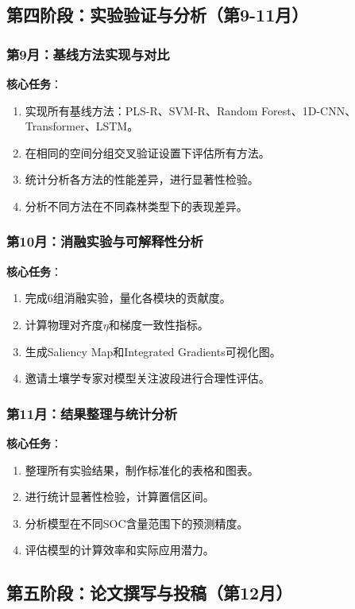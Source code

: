 \documentclass[12pt, a4paper]{article}
\begin{document}
\subsection{第四阶段：实验验证与分析（第9-11月）}

\subsubsection{第9月：基线方法实现与对比}
\textbf{核心任务}：
\begin{enumerate}
    \item 实现所有基线方法：PLS-R、SVM-R、Random Forest、1D-CNN、Transformer、LSTM。
    \item 在相同的空间分组交叉验证设置下评估所有方法。
    \item 统计分析各方法的性能差异，进行显著性检验。
    \item 分析不同方法在不同森林类型下的表现差异。
\end{enumerate}

\subsubsection{第10月：消融实验与可解释性分析}
\textbf{核心任务}：
\begin{enumerate}
    \item 完成6组消融实验，量化各模块的贡献度。
    \item 计算物理对齐度$\eta$和梯度一致性指标。
    \item 生成Saliency Map和Integrated Gradients可视化图。
    \item 邀请土壤学专家对模型关注波段进行合理性评估。
\end{enumerate}

\subsubsection{第11月：结果整理与统计分析}
\textbf{核心任务}：
\begin{enumerate}
    \item 整理所有实验结果，制作标准化的表格和图表。
    \item 进行统计显著性检验，计算置信区间。
    \item 分析模型在不同SOC含量范围下的预测精度。
    \item 评估模型的计算效率和实际应用潜力。
\end{enumerate}

\subsection{第五阶段：论文撰写与投稿（第12月）}
\end{document}
